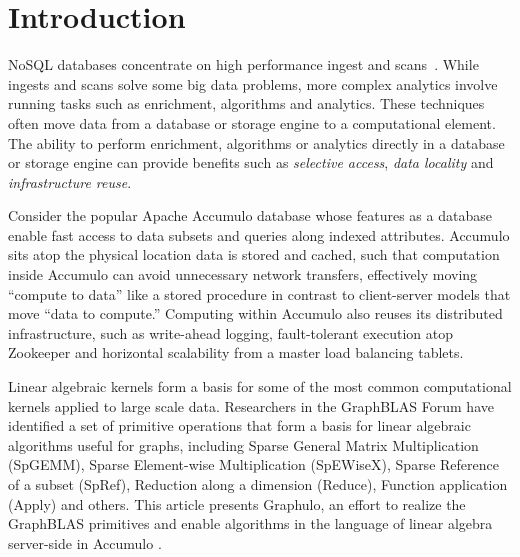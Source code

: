 
\section{Introduction}
\label{sIntro}
% 


NoSQL databases %
concentrate on high performance ingest and scans~\cite{sen2013benchmarking}. 
While ingests and scans solve some big data problems,
more complex analytics involve running tasks
such as enrichment, algorithms and analytics. These techniques
often move data from a database or storage engine to a
computational element. The ability to
perform enrichment, algorithms or analytics directly in a database or
storage engine can provide benefits such as \emph{selective access},
\emph{data locality} and \emph{infrastructure reuse}. 

Consider the popular Apache Accumulo database whose features as a database enable
fast access to data subsets and queries along indexed attributes. 
Accumulo sits atop the physical location data is stored and cached, 
such that computation inside Accumulo can avoid unnecessary network transfers,
effectively moving ``compute to data'' like a stored procedure
in contrast to client-server models that move ``data to compute.''
Computing within Accumulo also reuses its distributed infrastructure, 
such as write-ahead logging, fault-tolerant execution atop Zookeeper and 
horizontal scalability from a master load balancing tablets.

Linear algebraic kernels form a basis for some of the most common
computational kernels applied to large scale data. 
Researchers in the GraphBLAS Forum \cite{mattson2014standards} have identified a set of primitive operations 
that form a basis for linear algebraic algorithms useful for graphs, including 
Sparse General Matrix Multiplication (SpGEMM),  Sparse Element-wise Multiplication (SpEWiseX),
Sparse Reference of a subset (SpRef), Reduction along a dimension (Reduce),
Function application (Apply) and others.
This article presents Graphulo, an effort to realize the GraphBLAS primitives 
and enable algorithms in the language of linear algebra server-side in Accumulo \cite{gadepally2015gabb}.

